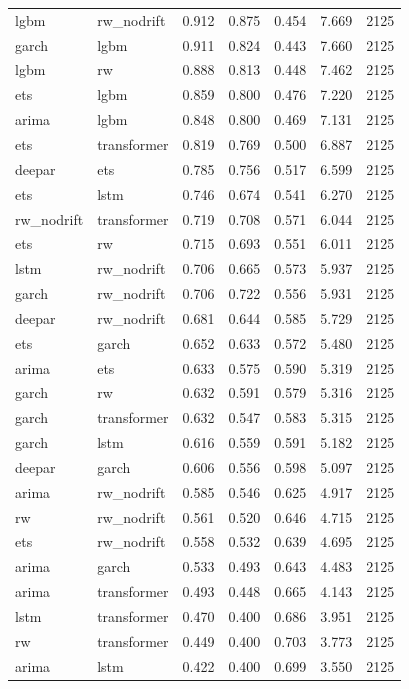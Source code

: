 \begin{table}
\begin{tabular}{llrrrrr}
lgbm & rw\_nodrift & 0.912 & 0.875 & 0.454 & 7.669 & 2125 \\
garch & lgbm & 0.911 & 0.824 & 0.443 & 7.660 & 2125 \\
lgbm & rw & 0.888 & 0.813 & 0.448 & 7.462 & 2125 \\
ets & lgbm & 0.859 & 0.800 & 0.476 & 7.220 & 2125 \\
arima & lgbm & 0.848 & 0.800 & 0.469 & 7.131 & 2125 \\
ets & transformer & 0.819 & 0.769 & 0.500 & 6.887 & 2125 \\
deepar & ets & 0.785 & 0.756 & 0.517 & 6.599 & 2125 \\
ets & lstm & 0.746 & 0.674 & 0.541 & 6.270 & 2125 \\
rw\_nodrift & transformer & 0.719 & 0.708 & 0.571 & 6.044 & 2125 \\
ets & rw & 0.715 & 0.693 & 0.551 & 6.011 & 2125 \\
lstm & rw\_nodrift & 0.706 & 0.665 & 0.573 & 5.937 & 2125 \\
garch & rw\_nodrift & 0.706 & 0.722 & 0.556 & 5.931 & 2125 \\
deepar & rw\_nodrift & 0.681 & 0.644 & 0.585 & 5.729 & 2125 \\
ets & garch & 0.652 & 0.633 & 0.572 & 5.480 & 2125 \\
arima & ets & 0.633 & 0.575 & 0.590 & 5.319 & 2125 \\
garch & rw & 0.632 & 0.591 & 0.579 & 5.316 & 2125 \\
garch & transformer & 0.632 & 0.547 & 0.583 & 5.315 & 2125 \\
garch & lstm & 0.616 & 0.559 & 0.591 & 5.182 & 2125 \\
deepar & garch & 0.606 & 0.556 & 0.598 & 5.097 & 2125 \\
arima & rw\_nodrift & 0.585 & 0.546 & 0.625 & 4.917 & 2125 \\
rw & rw\_nodrift & 0.561 & 0.520 & 0.646 & 4.715 & 2125 \\
ets & rw\_nodrift & 0.558 & 0.532 & 0.639 & 4.695 & 2125 \\
arima & garch & 0.533 & 0.493 & 0.643 & 4.483 & 2125 \\
arima & transformer & 0.493 & 0.448 & 0.665 & 4.143 & 2125 \\
lstm & transformer & 0.470 & 0.400 & 0.686 & 3.951 & 2125 \\
rw & transformer & 0.449 & 0.400 & 0.703 & 3.773 & 2125 \\
arima & lstm & 0.422 & 0.400 & 0.699 & 3.550 & 2125 \\

\end{tabular}
\end{table}
